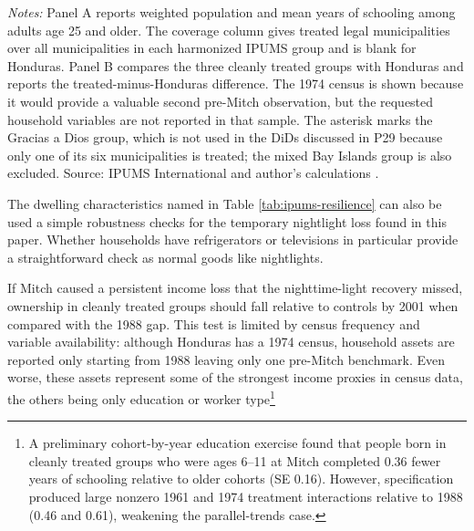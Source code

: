 \documentclass[12pt]{article}
\newcommand{\tablenotes}[1]{\vspace{0.3em}\begin{minipage}{0.92\linewidth}\footnotesize\emph{Notes:} #1\end{minipage}}
\begin{document}
\begin{table}[p]
\centering
\caption{\label{tab:ipums-resilience}Population, education, and dwelling conditions in Honduran 50-knot census groups}
\begingroup
\scriptsize
\setlength{\tabcolsep}{3pt}

\endgroup
\tablenotes{Panel A reports weighted population and mean years of schooling among adults age 25 and older. The coverage column gives treated legal municipalities over all municipalities in each harmonized IPUMS group and is blank for Honduras. Panel B compares the three cleanly treated groups with Honduras and reports the treated-minus-Honduras difference. The 1974 census is shown because it would provide a valuable second pre-Mitch observation, but the requested household variables are not reported in that sample. The asterisk marks the Gracias a Dios group, which is not used in the DiDs discussed in P29 because only one of its six municipalities is treated; the mixed Bay Islands group is also excluded. Source: IPUMS International and author's calculations \parencite{ipumsinternational2025}.}
\end{table}

The dwelling characteristics named in Table \ref{tab:ipums-resilience} can also be used a simple robustness checks for the temporary nightlight loss found in this paper. Whether households have refrigerators or televisions in particular provide a straightforward check as normal goods like nightlights.

 If Mitch caused a persistent income loss that the nighttime-light recovery missed, ownership in cleanly treated groups should fall relative to controls by 2001 when compared with the 1988 gap. This test is limited by census frequency and variable availability: although Honduras has a 1974 census, household assets are reported only starting from 1988 leaving only one pre-Mitch benchmark. Even worse, these assets represent some of the strongest income proxies in census data, the others being only education or worker type\footnote{A preliminary cohort-by-year education exercise found that people born in cleanly treated groups who were ages 6--11 at Mitch completed 0.36 fewer years of schooling relative to older cohorts (SE 0.16). However, specification produced large nonzero 1961 and 1974 treatment interactions relative to 1988 (0.46 and 0.61), weakening the parallel-trends case.}
\end{document}
